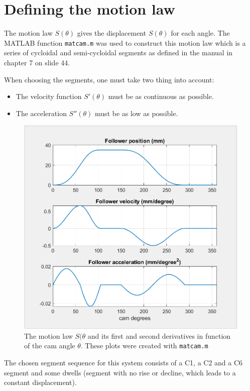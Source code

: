 \documentclass[a4paper]{article}
\begin{document}
\clearpage
\tableofcontents

\section{Defining the motion law}

The motion law \(S(\theta)\) gives the displacement \(S(\theta)\) for each angle. The MATLAB function \texttt{matcam.m} was used to construct this motion law which is a series of cycloidal and semi-cycloidal segments as defined in the manual \cite{cursus} in chapter 7 on slide 44.

When choosing the segments, one must take two thing into account:
\begin{itemize}
	\item The velocity function \(S'(\theta)\) must be as continuous as possible.
	\item The acceleration \(S''(\theta)\) must be as low as possible.
\end{itemize}


\begin{figure}[h]
	\centering
	\includegraphics[width=.78\textwidth]{hefwet.png}
	\caption{The motion law \(S(\theta\) and its first and second derivatives in function of the cam angle \(\theta\). These plots were created with \texttt{matcam.m}}
	\label{fig:hefwet}
	
\end{figure}

The chosen segment sequence for this system consists of a C1, a C2 and a C6 segment and some dwells (segment with no rise or decline, which leads to a constant displacement).
\end{document}
